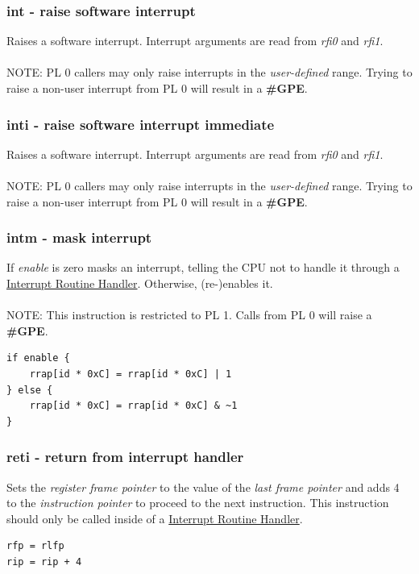\documentclass[a4paper,10pt]{article}
\begin{document}
\subsubsection{int - raise software interrupt}
	{
		Raises a software interrupt. Interrupt arguments are read from \emph{rfi0} and \emph{rfi1}.
		\\\\
		NOTE: \acrshort{PL} 0 callers may only raise interrupts in the \emph{user-defined} range. Trying to raise a non-user interrupt from \acrshort{PL} 0 will result in a \textbf{\#GPE}.
	}

\subsubsection{inti - raise software interrupt immediate}
	{
		Raises a software interrupt. Interrupt arguments are read from \emph{rfi0} and \emph{rfi1}.
		\\\\
		NOTE: \acrshort{PL} 0 callers may only raise interrupts in the \emph{user-defined} range. Trying to raise a non-user interrupt from \acrshort{PL} 0 will result in a \textbf{\#GPE}.
	}

\subsubsection{intm - mask interrupt}
	{
		If \emph{enable} is zero masks an interrupt, telling the CPU not to handle it through a \hyperref[CPU-ir:HANDLER]{Interrupt Routine Handler}. Otherwise, (re-)enables it.
		\\\\
		NOTE: This instruction is restricted to \acrshort{PL} 1. Calls from \acrshort{PL} 0 will raise a \textbf{\#GPE}.
	}
\begin{lstlisting}
if enable {
	rrap[id * 0xC] = rrap[id * 0xC] | 1
} else {
	rrap[id * 0xC] = rrap[id * 0xC] & ~1
}
\end{lstlisting}

\subsubsection{reti - return from interrupt handler}
	{Sets the \emph{register frame pointer} to the value of the \emph{last frame pointer} and adds 4 to the \emph{instruction pointer} to proceed to the next instruction. This instruction should only be called inside of a \hyperref[CPU-ir:HANDLER]{Interrupt Routine Handler}.}
\begin{lstlisting}
rfp = rlfp
rip = rip + 4
\end{lstlisting}
\end{document}
